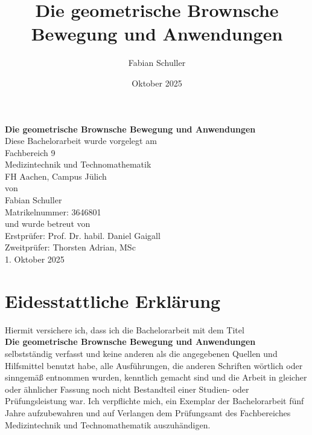 \documentclass{article}
\title{Die geometrische Brownsche Bewegung und Anwendungen}
\author{Fabian Schuller}
\date{Oktober 2025}
\theoremstyle{mystyle}
\begin{document}

\begin{center}
    \vspace*{2cm}
    {\LARGE \textbf{Die geometrische Brownsche Bewegung und Anwendungen}}\\[2cm]

    {\large Diese Bachelorarbeit wurde vorgelegt am\\[0.5cm]
    
    Fachbereich 9 \\[0.3cm]
    Medizintechnik und Technomathematik\\[0.3cm]
    FH Aachen, Campus Jülich\\[0.9cm]
   

    von\\[0.9cm]
    Fabian Schuller\\
    Matrikelnummer: 3646801\\[0.9cm]

    und wurde betreut von\\[0.9cm]

    Erstprüfer: Prof. Dr. habil. Daniel Gaigall\\[0.3cm]
    Zweitprüfer: Thorsten Adrian, MSc\\[2cm]
}
    1. Oktober 2025

    \vfill
\end{center}

\thispagestyle{empty}

\newpage

\section*{Eidesstattliche Erklärung}

\noindent
Hiermit versichere ich, dass ich die Bachelorarbeit mit dem Titel \\[0.5cm] \textbf{Die geometrische Brownsche Bewegung und Anwendungen} \\[0.5cm]selbstständig verfasst und keine anderen als die angegebenen Quellen und Hilfsmittel benutzt habe, alle Ausführungen, die anderen Schriften wörtlich oder sinngemäß entnommen wurden, kenntlich gemacht sind und die Arbeit in gleicher oder ähnlicher Fassung noch nicht Bestandteil einer Studien- oder Prüfungsleistung war. Ich verpflichte mich, ein Exemplar der Bachelorarbeit fünf Jahre aufzubewahren und auf Verlangen dem Prüfungsamt des Fachbereiches Medizintechnik und Technomathematik auszuhändigen.
\\[2cm]
\end{document}

